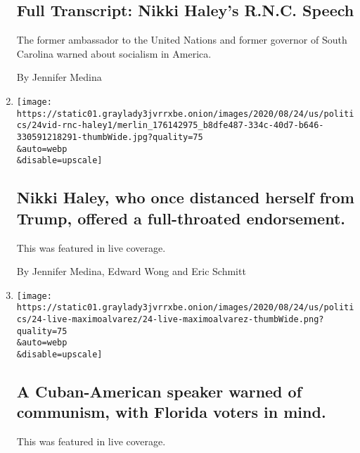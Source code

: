 \begin{enumerate}
  \hypertarget{full-transcript-nikki-haleys-rnc-speech}{%
  \subsection{Full Transcript: Nikki Haley's R.N.C.
  Speech}\label{full-transcript-nikki-haleys-rnc-speech}}

  The former ambassador to the United Nations and former governor of
  South Carolina warned about socialism in America.

  By Jennifer Medina
\item
  \href{/live/2020/08/24/us/rnc-convention-election/Nikki-Haley-who-once-distanced-herself-from-Trump-offered-a-full-throated-endorsement}{}

  \texttt{[image: https://static01.graylady3jvrrxbe.onion/images/2020/08/24/us/politics/24vid-rnc-haley1/merlin\_176142975\_b8dfe487-334c-40d7-b646-330591218291-thumbWide.jpg?quality=75\\\&auto=webp\\\&disable=upscale]}

  \hypertarget{nikki-haley-who-once-distanced-herself-from-trump-offered-a-full-throated-endorsement}{%
  \subsection{Nikki Haley, who once distanced herself from Trump,
  offered a full-throated
  endorsement.}\label{nikki-haley-who-once-distanced-herself-from-trump-offered-a-full-throated-endorsement}}

  This was featured in live coverage.

  By Jennifer Medina, Edward Wong and Eric Schmitt
\item
  \href{/live/2020/08/24/us/rnc-convention-election/a-cuban-american-speaker-warned-of-communism-with-florida-voters-in-mind}{}

  \texttt{[image: https://static01.graylady3jvrrxbe.onion/images/2020/08/24/us/politics/24-live-maximoalvarez/24-live-maximoalvarez-thumbWide.png?quality=75\\\&auto=webp\\\&disable=upscale]}

  \hypertarget{a-cuban-american-speaker-warned-of-communism-with-florida-voters-in-mind}{%
  \subsection{A Cuban-American speaker warned of communism, with Florida
  voters in
  mind.}\label{a-cuban-american-speaker-warned-of-communism-with-florida-voters-in-mind}}

  This was featured in live coverage.


\end{enumerate}
